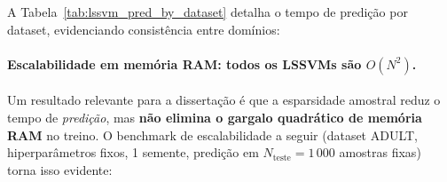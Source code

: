\documentclass[12pt,a4paper]{article}
\begin{document}
A Tabela~\ref{tab:lssvm_pred_by_dataset} detalha o tempo de predição por
dataset, evidenciando consistência entre domínios:

\begin{table}[H]
\centering
\caption{Tempo de predição (ms) por dataset, Tier 2. Média de 30 sementes,
$N_{\text{teste}}{\approx}858$.}
\label{tab:lssvm_pred_by_dataset}
\end{table}

\paragraph{Escalabilidade em memória RAM: todos os LSSVMs são $O(N^2)$.}
Um resultado relevante para a dissertação é que a esparsidade amostral
reduz o tempo de \emph{predição}, mas \textbf{não elimina o gargalo
quadrático de memória RAM} no treino. O benchmark de escalabilidade a seguir
(dataset ADULT, hiperparâmetros fixos, 1 semente, predição em $N_{\text{teste}}{=}1\,000$
amostras fixas) torna isso evidente:
\end{document}
